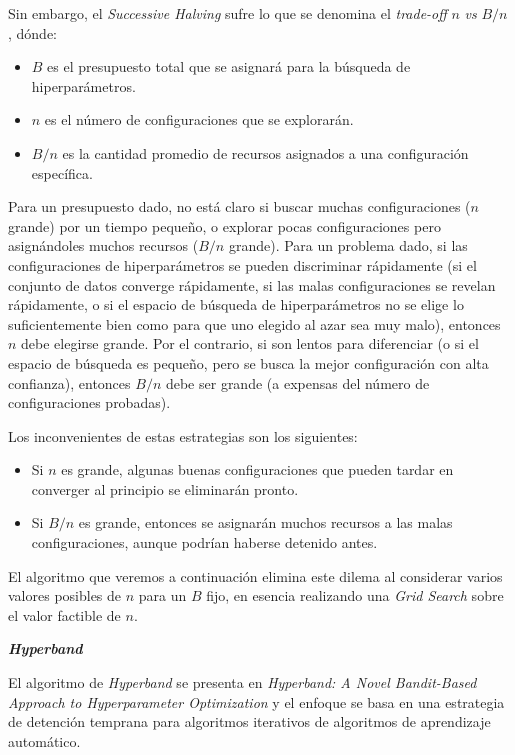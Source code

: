 \documentclass[a4paper,12pt]{article}
\begin{document}
Sin embargo, el \textit{Successive Halving} sufre lo que se denomina el \textit{trade-off} $n$ \textit{vs} $B/n$ \citep{Bissuel2019Apr}, dónde:
\begin{itemize}
	\item $B$ es el presupuesto total que se asignará para la búsqueda de hiperparámetros.
	\item $n$ es el número de configuraciones que se explorarán.
	\item $B/n$ es la cantidad promedio de recursos asignados a una configuración específica.
\end{itemize}

Para un presupuesto dado, no está claro si buscar muchas configuraciones ($n$ grande) por un tiempo pequeño, o explorar pocas configuraciones pero asignándoles muchos recursos ($B/n$ grande). Para un problema dado, si las configuraciones de hiperparámetros se pueden discriminar rápidamente (si el conjunto de datos converge rápidamente, si las malas configuraciones se revelan rápidamente, o si el espacio de búsqueda de hiperparámetros no se elige lo suficientemente bien como para que uno elegido al azar sea muy malo), entonces $n$ debe elegirse grande. Por el contrario, si son lentos para diferenciar (o si el espacio de búsqueda es pequeño, pero se busca la mejor configuración con alta confianza), entonces $B/n$ debe ser grande (a expensas del número de configuraciones probadas).

Los inconvenientes de estas estrategias son los siguientes:
\begin{itemize}
	\item Si $n$ es grande, algunas buenas configuraciones que pueden tardar en converger al principio se eliminarán pronto.
	\item Si $B/n$ es grande, entonces se asignarán muchos recursos a las malas configuraciones, aunque podrían haberse detenido antes.
\end{itemize}

El algoritmo que veremos a continuación elimina este dilema al considerar varios valores posibles de $n$ para un $B$ fijo, en esencia realizando una \textit{Grid Search} sobre el valor factible de $n$.

\hfill

\textbf{\textit{Hyperband}} \label{hyperband}

El algoritmo de \textit{Hyperband} se presenta en \textit{ Hyperband: A Novel Bandit-Based Approach to Hyperparameter Optimization} \citep{li2018hyperband} y el enfoque se basa en una estrategia de detención temprana para algoritmos iterativos de algoritmos de aprendizaje automático.
\end{document}
